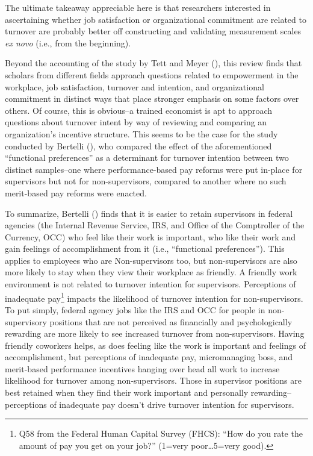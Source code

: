 \documentclass[
  11pt,
  a4paper,
]{article}
\begin{document}
The ultimate takeaway appreciable here is that researchers interested in
ascertaining whether job satisfaction or organizational commitment are
related to turnover are probably better off constructing and validating
measurement scales \emph{ex novo} (i.e., from the beginning).

Beyond the accounting of the study by Tett and Meyer
(), this review finds that scholars from
different fields approach questions related to empowerment in the
workplace, job satisfaction, turnover and intention, and organizational
commitment in distinct ways that place stronger emphasis on some factors
over others. Of course, this is obvious--a trained economist is apt to
approach questions about turnover intent by way of reviewing and
comparing an organization's incentive structure. This seems to be the
case for the study conducted by Bertelli
(), who compared the effect of the
aforementioned ``functional preferences'' as a determinant for turnover
intention between two distinct samples--one where performance-based pay
reforms were put in-place for supervisors but not for non-supervisors,
compared to another where no such merit-based pay reforms were enacted.

To summarize, Bertelli () finds that it
is easier to retain supervisors in federal agencies (the Internal
Revenue Service, IRS, and Office of the Comptroller of the Currency,
OCC) who feel like their work is important, who like their work and gain
feelings of accomplishment from it (i.e., ``functional preferences'').
This applies to employees who are Non-supervisors too, but
non-supervisors are also more likely to stay when they view their
workplace as friendly. A friendly work environment is not related to
turnover intention for supervisors. Perceptions of inadequate
pay\footnote{Q58 from the Federal Human Capital Survey (FHCS): ``How do
  you rate the amount of pay you get on your job?'' (1=very
  poor\ldots5=very good).} impacts the likelihood of turnover intention
for non-supervisors. To put simply, federal agency jobs like the IRS and
OCC for people in non-supervisory positions that are not perceived as
financially and psychologically rewarding are more likely to see
increased turnover from non-supervisors. Having friendly coworkers
helps, as does feeling like the work is important and feelings of
accomplishment, but perceptions of inadequate pay, micromanaging boss,
and merit-based performance incentives hanging over head all work to
increase likelihood for turnover among non-supervisors. Those in
supervisor positions are best retained when they find their work
important and personally rewarding--perceptions of inadequate pay
doesn't drive turnover intention for supervisors.
\end{document}
